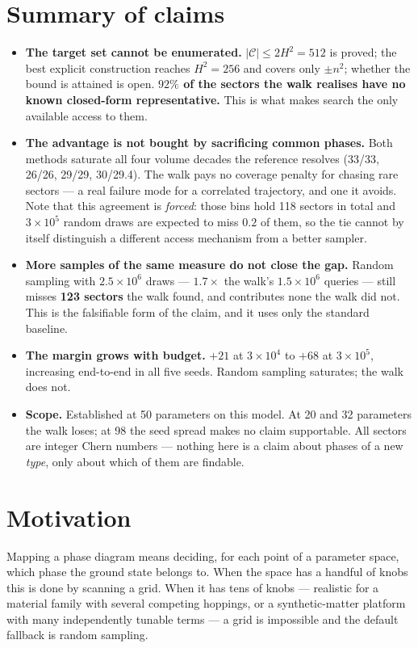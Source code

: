 \documentclass[11pt]{article}
\newcommand{\good}[1]{\textcolor{blue!70!black}{\textbf{#1}}}
\begin{document}
\section*{Summary of claims}
\vspace{-2pt}
\begin{itemize}\itemsep2pt
\item \textbf{The target set cannot be enumerated.} $|\mathcal{C}|\le2H^2=512$
is proved; the best explicit construction reaches $H^2=256$ and covers only
$\pm n^2$; whether the bound is attained is open. \good{$92\%$ of the sectors
the walk realises have no known closed-form representative.} This is what makes
search the only available access to them.
\item \textbf{The advantage is not bought by sacrificing common phases.} Both
methods saturate all four volume decades the reference resolves
(33/33, 26/26, 29/29, 30/29.4). The walk pays no coverage penalty for chasing
rare sectors --- a real failure mode for a correlated trajectory, and one it
avoids. Note that this agreement is \emph{forced}: those bins hold 118 sectors
in total and $3\times10^5$ random draws are expected to miss $0.2$ of them, so
the tie cannot by itself distinguish a different access mechanism from a
better sampler.
\item \textbf{More samples of the same measure do not close the gap.} Random
sampling with $2.5\times10^{6}$ draws --- $1.7\times$ the walk's $1.5\times10^6$
queries --- still misses \good{123 sectors} the walk found, and contributes
none the walk did not. This is the falsifiable form of the claim, and it uses
only the standard baseline.
\item \textbf{The margin grows with budget.} $+21$ at $3\times10^4$ to $+68$ at
$3\times10^5$, increasing end-to-end in all five seeds. Random sampling
saturates; the walk does not.
\item \textbf{Scope.} Established at 50 parameters on this model. At 20 and 32
parameters the walk loses; at 98 the seed spread makes no claim supportable.
All sectors are integer Chern numbers --- nothing here is a claim about phases
of a new \emph{type}, only about which of them are findable.
\end{itemize}

\section{Motivation}

Mapping a phase diagram means deciding, for each point of a parameter space,
which phase the ground state belongs to. When the space has a handful of knobs
this is done by scanning a grid. When it has tens of knobs --- realistic for a
material family with several competing hoppings, or a synthetic-matter platform
with many independently tunable terms --- a grid is impossible and the default
fallback is random sampling.
\end{document}
